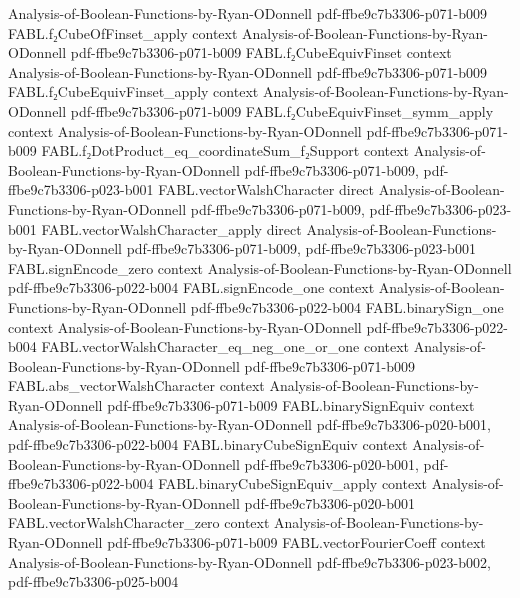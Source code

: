 \begin{theorem}
  {Analysis-of-Boolean-Functions-by-Ryan-ODonnell}
  {pdf-ffbe9c7b3306-p071-b009}
\proofstep
  {FABL.f₂CubeOfFinset_apply}
  {context}
  {Analysis-of-Boolean-Functions-by-Ryan-ODonnell}
  {pdf-ffbe9c7b3306-p071-b009}
\proofstep
  {FABL.f₂CubeEquivFinset}
  {context}
  {Analysis-of-Boolean-Functions-by-Ryan-ODonnell}
  {pdf-ffbe9c7b3306-p071-b009}
\proofstep
  {FABL.f₂CubeEquivFinset_apply}
  {context}
  {Analysis-of-Boolean-Functions-by-Ryan-ODonnell}
  {pdf-ffbe9c7b3306-p071-b009}
\proofstep
  {FABL.f₂CubeEquivFinset_symm_apply}
  {context}
  {Analysis-of-Boolean-Functions-by-Ryan-ODonnell}
  {pdf-ffbe9c7b3306-p071-b009}
\proofstep
  {FABL.f₂DotProduct_eq_coordinateSum_f₂Support}
  {context}
  {Analysis-of-Boolean-Functions-by-Ryan-ODonnell}
  {pdf-ffbe9c7b3306-p071-b009,
    pdf-ffbe9c7b3306-p023-b001}
\proofstep
  {FABL.vectorWalshCharacter}
  {direct}
  {Analysis-of-Boolean-Functions-by-Ryan-ODonnell}
  {pdf-ffbe9c7b3306-p071-b009,
    pdf-ffbe9c7b3306-p023-b001}
\proofstep
  {FABL.vectorWalshCharacter_apply}
  {direct}
  {Analysis-of-Boolean-Functions-by-Ryan-ODonnell}
  {pdf-ffbe9c7b3306-p071-b009,
    pdf-ffbe9c7b3306-p023-b001}
\proofstep
  {FABL.signEncode_zero}
  {context}
  {Analysis-of-Boolean-Functions-by-Ryan-ODonnell}
  {pdf-ffbe9c7b3306-p022-b004}
\proofstep
  {FABL.signEncode_one}
  {context}
  {Analysis-of-Boolean-Functions-by-Ryan-ODonnell}
  {pdf-ffbe9c7b3306-p022-b004}
\proofstep
  {FABL.binarySign_one}
  {context}
  {Analysis-of-Boolean-Functions-by-Ryan-ODonnell}
  {pdf-ffbe9c7b3306-p022-b004}
\proofstep
  {FABL.vectorWalshCharacter_eq_neg_one_or_one}
  {context}
  {Analysis-of-Boolean-Functions-by-Ryan-ODonnell}
  {pdf-ffbe9c7b3306-p071-b009}
\proofstep
  {FABL.abs_vectorWalshCharacter}
  {context}
  {Analysis-of-Boolean-Functions-by-Ryan-ODonnell}
  {pdf-ffbe9c7b3306-p071-b009}
\proofstep
  {FABL.binarySignEquiv}
  {context}
  {Analysis-of-Boolean-Functions-by-Ryan-ODonnell}
  {pdf-ffbe9c7b3306-p020-b001,
    pdf-ffbe9c7b3306-p022-b004}
\proofstep
  {FABL.binaryCubeSignEquiv}
  {context}
  {Analysis-of-Boolean-Functions-by-Ryan-ODonnell}
  {pdf-ffbe9c7b3306-p020-b001,
    pdf-ffbe9c7b3306-p022-b004}
\proofstep
  {FABL.binaryCubeSignEquiv_apply}
  {context}
  {Analysis-of-Boolean-Functions-by-Ryan-ODonnell}
  {pdf-ffbe9c7b3306-p020-b001}
\proofstep
  {FABL.vectorWalshCharacter_zero}
  {context}
  {Analysis-of-Boolean-Functions-by-Ryan-ODonnell}
  {pdf-ffbe9c7b3306-p071-b009}
\proofstep
  {FABL.vectorFourierCoeff}
  {context}
  {Analysis-of-Boolean-Functions-by-Ryan-ODonnell}
  {pdf-ffbe9c7b3306-p023-b002,
    pdf-ffbe9c7b3306-p025-b004}

\end{theorem}
